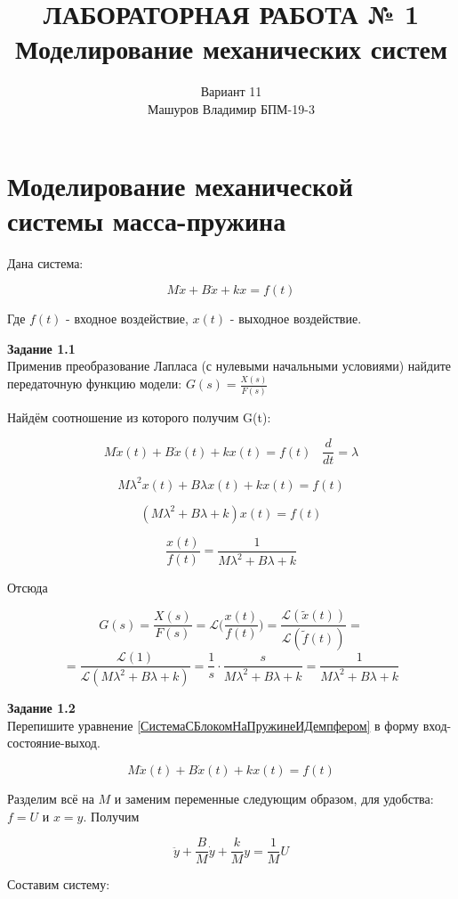 \documentclass[a4paper, 12pt]{article}
\title{ЛАБОРАТОРНАЯ РАБОТА № 1 \\
Моделирование механических систем
}
\author{Вариант 11 \\ Машуров Владимир БПМ-19-3}
\begin{document}
\maketitle
\thispagestyle{empty}
\newpage
\tableofcontents

\section{Моделирование механической системы масса-пружина}

Дана система:

\begin{equation}
M\dot{x} + B\dot{x} + kx = f(t)
\label{СистемаСБлокомНаПружинеИДемпфером}
\end{equation}

Где $f(t)$ - входное воздействие, $x(t)$ - выходное воздействие.
 
\textbf{Задание 1.1 } \\
Применив преобразование Лапласа (с нулевыми начальными условиями) найдите передаточную функцию модели: $ G(s) = \frac{X(s)}{F(s)} $ 

Найдём соотношение из которого получим G(t):


$$M\dot{x}(t) + B\dot{x}(t) + kx(t) = f(t) \; \; \; \frac{d}{dt} = \lambda $$

$$ M\lambda^2x(t) + B\lambda x(t) + kx(t) = f(t) $$

$$ (M\lambda^2 + B\lambda + k)x(t) = f(t) $$

$$ \frac{x(t)}{f(t)} = \frac{1}{M\lambda^2 + B\lambda + k} $$

Отсюда

$$ G(s) = \frac{X(s)}{F(s)} = \mathcal{L} \bigg( \frac{x(t)}{f(t)} \bigg) = \frac{\mathcal{L}(\tilde{x}(t))}{\mathcal{L}(\tilde{f}(t))} = $$
$$ = \frac{\mathcal{L}(1)}{\mathcal{L}(M\lambda^2 + B\lambda + k)} =  \frac{1}{s} \cdot \frac{s}{M\lambda^2 + B\lambda + k} = \frac{1}{M\lambda^2 + B\lambda + k} $$

\textbf{Задание 1.2 } \\
Перепишите уравнение \ref{СистемаСБлокомНаПружинеИДемпфером} в форму вход-состояние-выход.

$$M\ddot{x}(t) + B\dot{x}(t) + kx(t) = f(t) $$ 

Разделим всё на $M$ и заменим переменные следующим образом, для удобства: $f = U$ и $x = y$. Получим 

$$ \ddot{y} + \frac{B}{M}\dot{y} + \frac{k}{M}y = \frac{1}{M}U $$

Составим систему:
\end{document}
